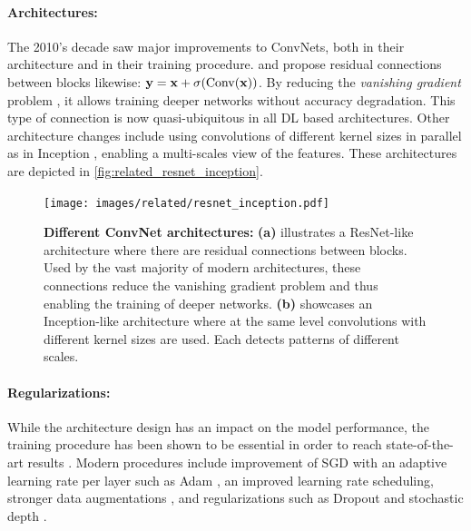 \paragraph{Architectures:}The 2010's decade saw major improvements to \acp{ConvNet}, both in their
architecture and in their training procedure. \citet{srivastava2015highwaynet} and
\citet{he2016resnet} propose residual connections between blocks likewise: $\mathbf{y} = \mathbf{x} +
      \sigma(\operatorname{Conv}(\mathbf{x}))$. By reducing the \textit{vanishing gradient} problem
\citep{hochreiter2001vanishinggrad}, it allows training deeper networks without accuracy
degradation. This type of connection is now quasi-ubiquitous in all \ac{DL} based architectures.
Other architecture changes include using convolutions of different kernel sizes in parallel as in
Inception \citep{szegedy2015inception}, enabling a multi-scales view of the features. These
architectures are depicted in \autoref{fig:related_resnet_inception}.

\begin{figure}[tb]
      \begin{center}
            \texttt{[image: images/related/resnet\_inception.pdf]}
      \end{center}
      \caption{\textbf{Different ConvNet architectures:} \textbf{(a)} illustrates a ResNet-like
            architecture where there are residual connections between blocks. Used by the vast
            majority of modern architectures, these connections reduce the vanishing gradient problem
            and thus enabling the training of deeper networks. \textbf{(b)} showcases an Inception-like
            architecture where at the same level convolutions with different kernel sizes are used.
            Each detects patterns of different scales.}
      \label{fig:related_resnet_inception}
\end{figure}

\paragraph{Regularizations:} While the architecture design has an impact on the model performance,
the training procedure has been shown to be essential in order to reach state-of-the-art results
\citep{wightman2019resnetstrikesback}. Modern procedures include improvement of \ac{SGD} with an
adaptive learning rate per layer such as Adam \citep{kingma2014adam}, an improved learning rate
scheduling, stronger data augmentations
\citep{muller2021trivialaugment,hingyi2018mixup,zhong2017erasing}, and regularizations such as
Dropout \citep{gal2016dropout} and stochastic depth \citep{gao2016stochasticdepth}.

